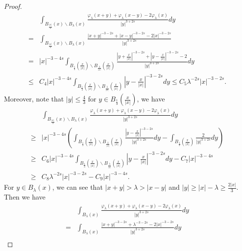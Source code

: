 \documentclass[reqno, 11pt]{amsart} %
\numberwithin{equation}{section}
\begin{document}
\begin{proof}
\begin{equation}
			\begin{split}
				&\int_{B_{\frac{|x|}{3}}(x)\backslash B_{\lambda}(x)}\frac{\varphi_{\lambda}(x+y)+\varphi_{\lambda}(x-y)-2\varphi_{\lambda}(x)}{|y|^{3+2s}}dy \\
				=&\int_{B_{\frac{|x|}{3}}(x)\backslash B_{\lambda}(x)}\frac{|x+y|^{-3-2s}+|x-y|^{-3-2s}-2|x|^{-3-2s}}{|y|^{3+2s}}\\
				=&|x|^{-3-4s}\int_{B_{\frac{1}{3}}\left( \frac{x}{|x|}\right)\backslash B_{\frac{\lambda}{|x|}}\left( \frac{x}{|x|}\right)}\frac{\left| y+\frac{x}{|x|}\right|^{-3-2s}+\left| y-\frac{x}{|x|}\right|^{-3-2s}-2}{|y|^{3+2s}}dy\\
				\leq&C_{4}|x|^{-3-4s}\int_{B_{\frac{1}{3}}\left( \frac{x}{|x|}\right)\backslash B_{\frac{\lambda}{|x|}}\left( \frac{x}{|x|}\right)}\left|y-\frac{x}{|x|} \right|^{-3-2s} dy\leq C_{5}\lambda^{-2s}|x|^{-3-2s}.
			\end{split}
		\end{equation}
		Moreover, note that $|y|\leq\frac{4}{3}$ for $y\in B_{\frac{1}{3}}\left( \frac{x}{|x|}\right)$, we have
		\begin{equation}\label{equ5-16}
			\begin{split}
				&\int_{B_{\frac{|x|}{3}}(x)\backslash B_{\lambda}(x)}\frac{\varphi_{\lambda}(x+y)+\varphi_{\lambda}(x-y)-2\varphi_{\lambda}(x)}{|y|^{3+2s}}dy\\
				\geq&|x|^{-3-4s}\left( \int_{B_{\frac{1}{3}}\left( \frac{x}{|x|}\right)\backslash B_{\frac{\lambda}{|x|}}\left( \frac{x}{|x|}\right)}\frac{\left|y-\frac{x}{|x|} \right|^{-3-2s}}{|y|^{3+2s}}dy-\int_{B_{\frac{1}{3}}\left( \frac{x}{|x|}\right)}\frac{2}{|y|^{3+2s}}dy\right) \\
				\geq& C_{6}|x|^{-3-4s}\int_{B_{\frac{1}{3}}\left( \frac{x}{|x|}\right)\backslash B_{\frac{\lambda}{|x|}}\left( \frac{x}{|x|}\right)}\left|y-\frac{x}{|x|} \right|^{-3-2s}dy-C_{7}|x|^{-3-4s}\\
				\geq&C_{8}\lambda^{-2s}|x|^{-3-2s}-C_{9}|x|^{-3-4s}.
			\end{split}
		\end{equation}
		For $y\in B_{\lambda}(x)$, we can see that $|x+y|>\lambda>|x-y|$ and $|y|\geq|x|-\lambda\geq\frac{2|x|}{3}$. Then we have
		\begin{equation}\label{equ5-17}
			\begin{split}
				&\int_{ B_{\lambda}(x)}\frac{\varphi_{\lambda}(x+y)+\varphi_{\lambda}(x-y)-2\varphi_{\lambda}(x)}{|y|^{3+2s}}dy\\
				=&\int_{ B_{\lambda}(x)}\frac{|x+y|^{-3-2s}+\lambda^{-3-2s}-2|x|^{-3-2s}}{|y|^{3+2s}}dy\\

\end{split}
\end{equation}
\end{proof}
\end{document}
